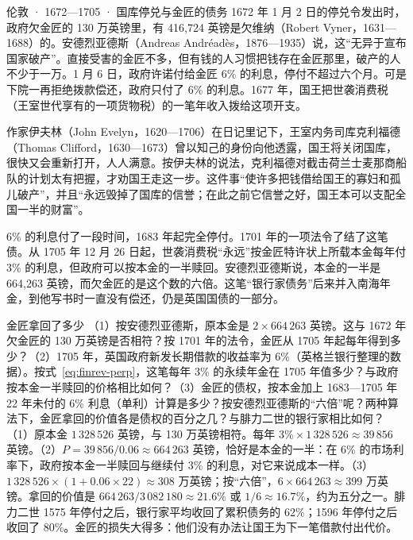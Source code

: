 \begin{case}{伦敦 · 1672—1705 · 国库停兑与金匠的债务}
1672 年 1 月 2 日的停兑令发出时，政府欠金匠的 130 万英镑里，有 416,724 英镑是欠维纳（Robert Vyner，1631—1688）的\cite{andreades1909}。安德烈亚德斯（Andreas Andréadès，1876—1935）说，这“无异于宣布国家破产”。直接受害的金匠不多，但有钱的人习惯把钱存在金匠那里，破产的人不少于一万\cite{andreades1909}。1 月 6 日，政府许诺付给金匠 6\% 的利息，停付不超过六个月。可是下院一再拒绝拨款偿还，政府只付了 6\% 的利息。1677 年，国王把世袭消费税（王室世代享有的一项货物税）的一笔年收入拨给这项开支\cite{andreades1909}。

作家伊夫林（John Evelyn，1620—1706）在日记里记下，王室内务司库克利福德（Thomas Clifford，1630—1673）曾以知己的身份向他透露，国王将关闭国库，很快又会重新打开，人人满意。按伊夫林的说法，克利福德对截击荷兰士麦那商船队的计划太有把握，才劝国王走这一步。这件事“使许多把钱借给国王的寡妇和孤儿破产”，并且“永远毁掉了国库的信誉；在此之前它信誉之好，国王本可以支配全国一半的财富”\cite{evelyn1901}。

6\% 的利息付了一段时间，1683 年起完全停付\cite{andreades1909}。1701 年的一项法令了结了这笔债。从 1705 年 12 月 26 日起，世袭消费税“永远”按金匠特许状上所载本金每年付 3\% 的利息，但政府可以按本金的一半赎回\cite{statutes1701}。安德烈亚德斯说，本金的一半是 664,263 英镑，而欠金匠的是这个数的六倍。这笔“银行家债务”后来并入南海年金，到他写书时一直没有偿还，仍是英国国债的一部分\cite{andreades1909}。
\end{case}

\begin{example}{金匠拿回了多少}\label{ex:finrev-stop}
（1）按安德烈亚德斯，原本金是 $2\times664\,263$ 英镑。这与 1672 年欠金匠的 130 万英镑是否相符？按 1701 年的法令，金匠从 1705 年起每年得到多少？（2）1705 年，英国政府新发长期借款的收益率为 6\%（英格兰银行整理的数据\cite{boe2017}）。按式~\eqref{eq:finrev-perp}，这笔每年 3\% 的永续年金在 1705 年值多少？与政府按本金一半赎回的价格相比如何？（3）金匠的债权，按本金加上 1683—1705 年 22 年未付的 6\% 利息（单利）计算是多少？按安德烈亚德斯的“六倍”呢？两种算法下，金匠拿回的价值各是债权的百分之几？与腓力二世的银行家相比如何？
\solution （1）原本金 $1\,328\,526$ 英镑，与 130 万英镑相符。每年 $3\%\times1\,328\,526\approx39\,856$ 英镑。（2）$P=39\,856/0.06\approx664\,263$ 英镑，恰好是本金的一半：在 6\% 的市场利率下，政府按本金一半赎回与继续付 3\% 的利息，对它来说成本一样。（3）$1\,328\,526\times(1+0.06\times22)\approx308$ 万英镑；按“六倍”，$6\times664\,263\approx399$ 万英镑。拿回的价值是 $664\,263/3\,082\,180\approx21.6\%$ 或 $1/6\approx16.7\%$，约为五分之一。腓力二世 1575 年停付之后，银行家平均收回了累积债务的 62\%；1596 年停付之后收回了 80\%\cite{dv2010}。金匠的损失大得多：他们没有办法让国王为下一笔借款付出代价。
\end{example}

